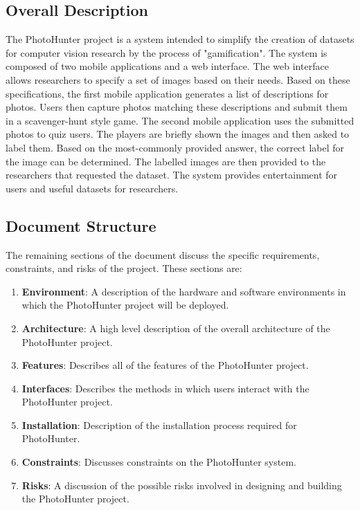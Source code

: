 \documentclass{article}
\begin{document}
\subsection{Overall Description}
The PhotoHunter project is a system intended to simplify the creation of
datasets for computer vision research by the process of "gamification". The
system is composed of two mobile applications and a web interface. The web
interface allows researchers to specify a set of images based on their needs.
Based on these specifications, the first mobile application generates a list of
descriptions for photos. Users then capture photos matching these descriptions
and submit them in a scavenger-hunt style game. The second mobile application
uses the submitted photos to quiz users. The players are briefly shown the
images and then asked to label them. Based on the most-commonly provided
answer, the correct label for the image can be determined. The labelled images
are then provided to the researchers that requested the dataset. The system
provides entertainment for users and useful datasets for researchers.

\subsection{Document Structure}
The remaining sections of the document discuss the specific requirements,
constraints, and risks of the project. These sections are:
\begin{enumerate}

  \item \textbf{Environment}: A description of the hardware and software
        environments in which the PhotoHunter project will be deployed.
  \item \textbf{Architecture}: A high level description of the overall
        architecture of the PhotoHunter project.
  \item \textbf{Features}: Describes all of the features of the PhotoHunter
        project.
  \item \textbf{Interfaces}: Describes the methods in which users interact with
        the PhotoHunter project.
  \item \textbf{Installation}: Description of the installation process required
        for PhotoHunter.
  \item \textbf{Constraints}: Discusses constraints on the PhotoHunter system.
  
  \item \textbf{Risks}: A discussion of the possible risks involved in designing
        and building the PhotoHunter project.

\end{enumerate}
\end{document}
